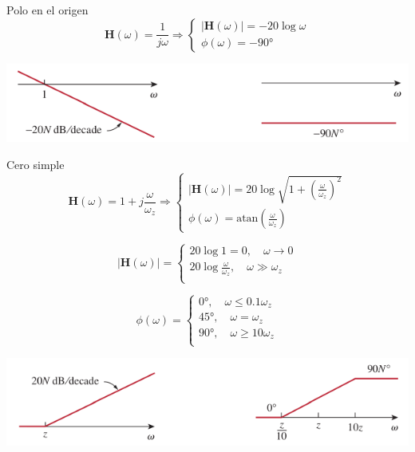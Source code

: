 \documentclass[xcolor={usenames,svgnames,dvipsnames}]{beamer}
\newcommand{\fasor}[1]{\mathbf{#1}(\omega)}
\newcommand{\atan}{\mathrm{atan}}
\begin{document}
\begin{frame}[label={sec:org13f097d}]{Polo en el origen}
\[
  \fasor{H} = \frac{1}{j\omega} \Rightarrow
  \begin{cases}
    |\fasor{H}| = - 20 \log \omega\\
    \phi(\omega) = - \ang{90}
  \end{cases}
\]

\begin{center}
\includegraphics[width=.9\linewidth]{figs/BodePoloOrigen.pdf}
\end{center}
\end{frame}

\begin{frame}[label={sec:orge8f6003}]{Cero simple}
\[
  \fasor{H} = 1 + j\frac{\omega}{\omega_z} \Rightarrow
  \begin{cases}
    |\fasor{H}| =  20 \log \sqrt{1 + \left(\frac{\omega}{\omega_z}\right)^2}\\
    \phi(\omega) = \atan(\frac{\omega}{\omega_z}) 
  \end{cases}
\]

\[
  |\fasor{H}| = 
  \begin{cases}
  20 \log 1 = 0, \quad \omega \to 0\\
  20 \log \frac{\omega}{\omega_z}, \quad \omega \gg \omega_z\\
  \end{cases}
\]

\[
  \phi(\omega) = 
  \begin{cases}
    \ang{0},\quad \omega \leq 0.1\omega_z\\
    \ang{45}, \quad \omega = \omega_z\\
    \ang{90}, \quad \omega \geq 10\omega_z\\
  \end{cases}
\]

\begin{center}
\includegraphics[width=.9\linewidth]{figs/BodeCeroSimple.pdf}
\end{center}
\end{frame}
\end{document}
